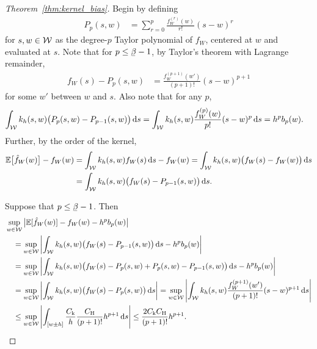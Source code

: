 \begin{proof}[Theorem~\ref{thm:kernel_bias}]

  Begin by defining
  \begin{align*}
    P_p(s,w)
    &=
    \sum_{r = 0}^p
    \frac{f_W^{(r)}(w)}{r!}
    {(s-w)^r}
  \end{align*}
  for $s, w \in \mathcal{W}$
  as the degree-$p$ Taylor polynomial of $f_W$,
  centered at $w$ and evaluated at $s$.
  Note that
  for $p \leq \flbeta-1$,
  by Taylor's theorem with Lagrange remainder,
  \begin{align*}
    f_W(s) - P_p(s,w)
    &=
    \frac{f_W^{(p+1)}(w')}{(p+1)!}
    (s-w)^{p+1}
  \end{align*}
  for some $w'$ between $w$ and $s$.
  Also note that for any $p$,
  \begin{align*}
    \int_{\mathcal{W}}
    k_h(s,w)
    \big(
      P_p(s,w)
      - P_{p-1}(s,w)
    \big)
    \,\mathrm{d}s
    &=
    \int_{\mathcal{W}}
    k_h(s,w)
    \frac{f_W^{(p)}(w)}{p!}
    (s-w)^p
    \,\mathrm{d}s
    = h^p b_p(w).
  \end{align*}
  Further, by the order of the kernel,
  \begin{align*}
    \mathbb{E}\big[\hat f_W(w)\big]
    - f_W(w)
    &=
    \int_{\mathcal{W}}
    k_h(s,w)
    f_W(s)
    \,\mathrm{d}s
    - f_W(w)
    =
    \int_{\mathcal{W}}
    k_h(s,w)
    \big(f_W(s) - f_W(w)\big)
    \,\mathrm{d}s \\
    &=
    \int_{\mathcal{W}}
    k_h(s,w)
    \big(f_W(s) - P_{p-1}(s,w)\big)
    \,\mathrm{d}s.
  \end{align*}

  Suppose that $p \leq \flbeta - 1$. Then
  \begin{align*}
    &\sup_{w \in \mathcal{W}}
    \big|
    \mathbb{E}[\hat f_W(w)]
    - f_W(w)
    - h^p b_p(w)
    \big| \\
    &\quad=
    \sup_{w \in \mathcal{W}}
    \left|
    \int_{\mathcal{W}}
    k_h(s,w)
    \big(f_W(s) - P_{p-1}(s,w)\big)
    \,\mathrm{d}s
    - h^p b_p(w)
    \right| \\
    &\quad=
    \sup_{w \in \mathcal{W}}
    \left|
    \int_{\mathcal{W}}
    k_h(s,w)
    \big(
      f_W(s) - P_{p}(s,w)
      + P_{p}(s,w) - P_{p-1}(s,w)
    \big)
    \,\mathrm{d}s
    - h^p b_p(w)
    \right| \\
    &\quad=
    \sup_{w \in \mathcal{W}}
    \left|
    \int_{\mathcal{W}}
    k_h(s,w)
    \big(
      f_W(s) - P_{p}(s,w)
    \big)
    \,\mathrm{d}s
    \right|
    = \sup_{w \in \mathcal{W}}
    \left|
    \int_{\mathcal{W}}
    k_h(s,w)
    \frac{f_W^{(p+1)}(w')}{(p+1)!}
    (s-w)^{p+1}
    \,\mathrm{d}s
    \right| \\
    &\quad\leq
    \sup_{w \in \mathcal{W}}
    \left|
    \int_{[w \pm h]}
    \frac{C_{\mathrm{k}}}{h}
    \frac{C_{\mathrm{H}}}{(p+1)!}
    h^{p+1}
    \,\mathrm{d}s
    \right|
    \leq
    \frac{2C_{\mathrm{k}} C_{\mathrm{H}}}{(p+1)!}
    h^{p+1}.
  \end{align*}


\end{proof}
